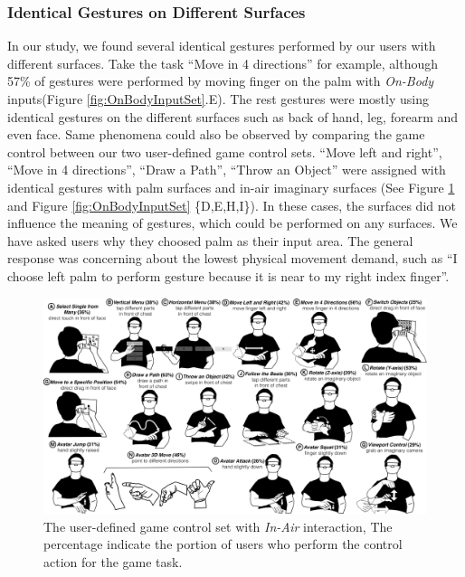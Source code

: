 \documentclass{sigchi}
\begin{document}
\subsubsection{Identical Gestures on Different Surfaces}
 In our study, we found several identical gestures performed by our users with different surfaces. Take the task ``Move in 4 directions'' for example, although 57\% of gestures were performed by moving finger on the palm with \emph{On-Body} inputs(Figure \ref{fig:OnBodyInputSet}.E). The rest gestures were mostly using identical gestures on the different surfaces such as back of hand, leg, forearm and even face. Same phenomena could also be observed by comparing the game control between our two user-defined game control sets. ``Move left and right'', ``Move in 4 directions'', ``Draw a Path'', ``Throw an Object'' were assigned with identical gestures with palm surfaces and in-air imaginary surfaces (See Figure \ref{fig:InAirSet} and Figure \ref{fig:OnBodyInputSet} \{D,E,H,I\}). In these cases, the surfaces did not influence the meaning of gestures, which could be performed on any surfaces. We have asked users why they choosed palm as their input area. The general response was concerning about the lowest physical movement demand, such as ``I choose left palm to perform gesture because it is near to my right index finger''.


  \begin{figure}
  \centering
  \includegraphics[width=1\textwidth]{InAirSet.pdf}
  \caption{The user-defined game control set with \emph{In-Air} interaction, The percentage indicate the portion of users who perform the control action for the game task.}
  \label{fig:InAirSet}
  \end{figure}
\end{document}
